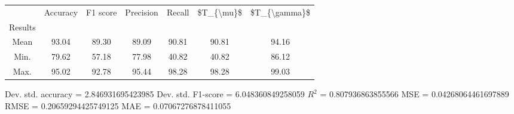 \begin{tabular}{|c|c|c|c|c|c|c|}
\toprule
{} &  Accuracy &  F1 score &  Precision &  Recall &  \$T\_\{\textbackslash mu\}\$ &  \$T\_\{\textbackslash gamma\}\$ \\
Results &           &           &            &         &            &               \\
\hline
Mean    &     93.04 &     89.30 &      89.09 &   90.81 &      90.81 &         94.16 \\
Min.    &     79.62 &     57.18 &      77.98 &   40.82 &      40.82 &         86.12 \\
Max.    &     95.02 &     92.78 &      95.44 &   98.28 &      98.28 &         99.03 \\
\bottomrule
\end{tabular}

 Dev. std. accuracy = 2.846931695423985
 Dev. std. F1-score = 6.048360849258059
 $R^2$ = 0.807936863855566
 MSE = 0.04268064461697889
 RMSE = 0.20659294425749125
 MAE = 0.07067276878411055